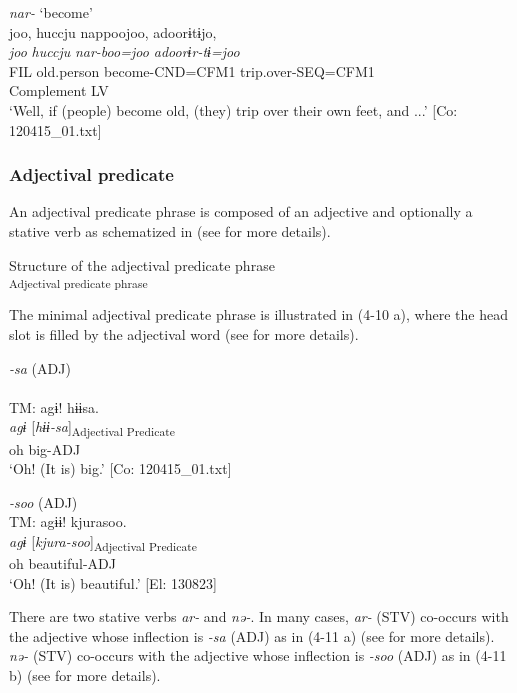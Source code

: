 \ex\textit{nar-} ‘become’\\
\glll joo,  huccju  nappoojoo,  adoorɨtɨjo,\\
    \textit{joo}  \textit{huccju}  \textit{nar{}-boo=joo  adoorɨr-tɨ=joo}\\
    FIL  old.person  become-CND=CFM1  trip.over-SEQ=CFM1\\
      Complement  LV  \\
    \glt ‘Well, if (people) become old, (they) trip over their own feet, and ...’     [Co: 120415\_01.txt]
    \z
\z

\subsubsection{Adjectival predicate}\label{sec:4.1.3.2}

An adjectival predicate phrase is composed of an adjective and optionally a stative verb as schematized in  (see  for more details).

\ea  Structure of the adjectival predicate phrase \label{ex:4.9}\\\textsubscript{Adjectival predicate phrase}
\z

The minimal adjectival predicate phrase is illustrated in (4-10 a), where the head slot is filled by the adjectival word (see  for more details).

\ea   \label{ex:4.10}
\ea \textit{{}-sa} (ADJ) \label{ex:4.10a}\\\\
\glll  TM:  agɨ!  hɨɨsa.\\
    \textit{agɨ}  [\textit{hɨɨ-sa}]\textsubscript{Adjectival Predicate}\\
    oh  big-ADJ\\
    \glt     ‘Oh! (It is) big.’ [Co: 120415\_01.txt]

  \ex \textit{{}-soo} (ADJ)\\
\glll  TM:  agɨɨ!  kjurasoo.\\
    \textit{agɨ}  [\textit{kjura-soo}]\textsubscript{Adjectival Predicate}\\
    oh  beautiful-ADJ\\
    \glt     ‘Oh! (It is) beautiful.’ [El: 130823]
    \z
\z

  There are two stative verbs \textit{ar-} and \textit{nə-}. In many cases, \textit{ar-} (STV) co-occurs with the adjective whose inflection is \textit{{}-sa} (ADJ) as in (4-11 a) (see  for more details). \textit{nə-} (STV) co-occurs with the adjective whose inflection is \textit{{}-soo} (ADJ) as in (4-11 b) (see  for more details).


